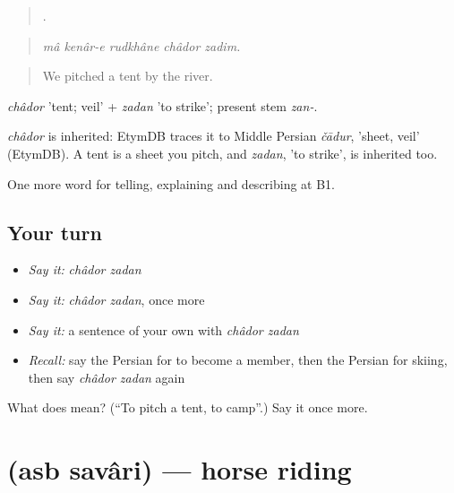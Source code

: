 \begin{quote}
    .
\end{quote}

\begin{quote}
\emph{mâ kenâr-e rudkhâne châdor zadim.}
\end{quote}

\begin{quote}
We pitched a tent by the river.
\end{quote}

\emph{châdor} 'tent; veil' + \emph{zadan} 'to strike'; present stem \emph{zan-}.

\begin{cousinweb}
\emph{châdor} is inherited: EtymDB traces it to Middle Persian \emph{čādur}, 'sheet, veil' (EtymDB). A tent is a sheet you pitch, and \emph{zadan}, 'to strike', is inherited too.
\end{cousinweb}

\begin{grammarlens}[title={What you've built}]
One more word for telling, explaining and describing at B1.
\end{grammarlens}

\subsection*{Your turn}
\begin{itemize}
\raggedright
  \item \emph{Say it:} \emph{châdor zadan}
  \item \emph{Say it:} \emph{châdor zadan}, once more
  \item \emph{Say it:} a sentence of your own with \emph{châdor zadan}
  \item \emph{Recall:} say the Persian for to become a member, then the Persian for skiing, then say \emph{châdor zadan} again
\end{itemize}

\begin{tcolorbox}[breakable,colback=teal!4,colframe=teal!35!black,title={Before you move on}]
What does   mean? (\textquotedblleft{}To pitch a tent, to camp\textquotedblright{}.) Say it once more.
\end{tcolorbox}
\section[\texorpdfstring{\fa{اسب} \fa{سواری} (asb savâri)}{اسب سواری (asb savâri)}]{  (asb savâri) — horse riding}

